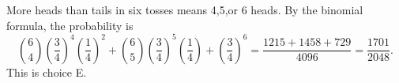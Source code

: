 More heads than tails in six tosses means 4,5,or 6 heads. By the binomial formula, the probability is\[\binom64\left(\dfrac{3}{4}\right)^4\left(\dfrac{1}{4}\right)^2+\binom65\left(\dfrac{3}{4}\right)^5\left(\dfrac{1}{4}\right)+\left(\dfrac{3}{4}\right)^6=\dfrac{1215+1458+729}{4096}=\boxed{\dfrac{1701}{2048}}.\]This is choice E.
